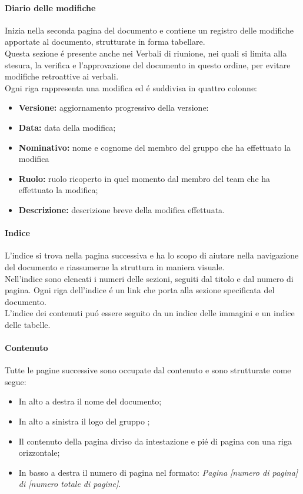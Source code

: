       \paragraph{Diario delle modifiche\\}
      Inizia nella seconda pagina del documento e contiene un registro delle modifiche apportate al documento, strutturate in forma tabellare.\\
      Questa sezione é presente anche nei Verbali di riunione, nei quali si limita alla stesura, la verifica e l'approvazione del documento in questo ordine, per evitare modifiche retroattive ai verbali.\\
      Ogni riga rappresenta una modifica ed é suddivisa in quattro colonne:
      \begin{itemize}
        \item \textbf{Versione:} aggiornamento progressivo della versione:
        \item \textbf{Data:} data della modifica;
        \item \textbf{Nominativo:} nome e cognome del membro del gruppo che ha effettuato la modifica
        \item \textbf{Ruolo:} ruolo ricoperto in quel momento dal membro del team che ha effettuato la modifica;
        \item \textbf{Descrizione:} descrizione breve della modifica effettuata.
      \end{itemize}

      \paragraph{Indice\\}
      L'indice si trova nella pagina successiva e ha lo scopo di aiutare nella navigazione del documento e riassumerne la struttura in maniera visuale.\\
      Nell'indice sono elencati i numeri delle sezioni, seguiti dal titolo e dal numero di pagina. Ogni riga dell'indice é un link che porta alla sezione specificata del documento.\\
      L'indice dei contenuti puó essere seguito da un indice delle immagini e un indice delle tabelle.

      \paragraph{Contenuto\\}
      Tutte le pagine successive sono occupate dal contenuto e sono strutturate come segue:
      \begin{itemize}
        \item In alto a destra il nome del documento;
        \item In alto a sinistra il logo del gruppo \Gruppo{};
        \item Il contenuto della pagina diviso da intestazione e pié di pagina con una riga orizzontale;
        \item In basso a destra il numero di pagina nel formato: \textit{Pagina [numero di pagina] di [numero totale di pagine]}.
      \end{itemize}

